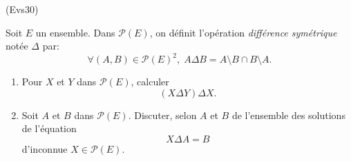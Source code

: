 \begin{tiny}(Evs30)\end{tiny} Soit $E$ un ensemble. Dans $\mathcal{P}(E)$, on définit l'opération \emph{différence symétrique}  notée $\Delta$ par:
\[
  \forall (A,B) \in \mathcal{P}(E)^2, \;
  A\Delta B = A \setminus B \cap B \setminus A.
\]
\begin{enumerate}
  \item Pour $X$ et $Y$ dans $\mathcal{P}(E)$, calculer
\[
  (X \Delta Y) \Delta X.
\]
  \item Soit $A$ et $B$ dans $\mathcal{P}(E)$. Discuter, selon $A$ et $B$ de l'ensemble des solutions de l'équation
\[
 X \Delta A =B
\]
d'inconnue $X\in \mathcal{P}(E)$.
\end{enumerate}
